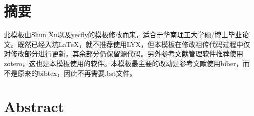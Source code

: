\chapter{摘\texorpdfstring{\quad}{}要}
	此模板由Shun Xu\cite{_}以及yecfly\cite{_a}的模板修改而来，适合于华南理工大学硕/博士毕业论文。既然已经入坑LaTeX，就不推荐使用LYX，但本模板在修改祖传代码过程中仅对修改部分进行更新，其余部分仍保留源代码。另外参考文献管理软件推荐使用zotero，这也是本模板使用的软件。本模板最主要的改动是参考文献使用biber，而不是原来的bibtex，因此不再需要.bst文件。


\chapter{Abstract}
	

